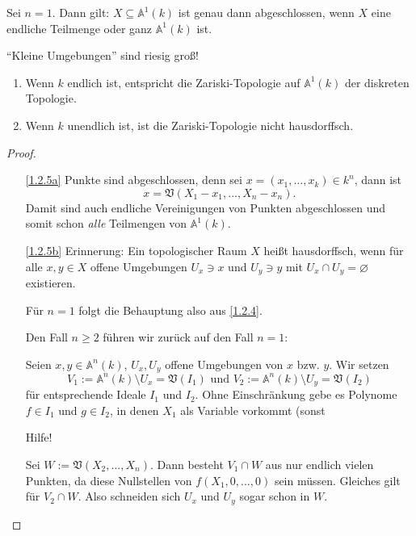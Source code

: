 \documentclass[a4paper,12pt]{scrbook}
\theoremstyle{keinenummern} %
\theoremstyle{mitnummern}
\theoremstyle{unserbeweis}
\newtheorem{proof}{Beweis}
\def\A{\mathbb{A}}
\def\V{\mathfrak{V}}
\newcommand{\leer}{\ensuremath{\varnothing}}
\renewcommand{\dotsc}{\ensuremath{\!...}}
\begin{document}
\begin{bsp}\label{1.2.4}
Sei $n=1$. Dann gilt: $X\subseteq\A^{1}(k)$ ist genau dann abgeschlossen, wenn $X$ eine endliche Teilmenge oder ganz $\A^{1}(k)$ ist.
\end{bsp}

\begin{w}\enquote{Kleine Umgebungen} sind riesig groß!\end{w}

\begin{bem}\label{1.2.5}
\begin{enumerate}
\item{} Wenn $k$ endlich ist, entspricht die Zariski-Topologie auf $\A^{1}(k)$ der diskreten Topologie.
\item{} Wenn $k$ unendlich ist, ist die Zariski-Topologie nicht hausdorffsch.
\end{enumerate}\end{bem}
\begin{proof}\begin{enumerate}
\item[\ref{1.2.5a}] Punkte sind abgeschlossen, denn sei $x=(x_{1},\dotsc,x_{k})\in k^{n}$, dann ist
\[{x}=\V(X_{1}-x_{1},\dotsc,X_{n}-x_{n}).\]
Damit sind auch endliche Vereinigungen von Punkten abgeschlossen und somit schon \emph{alle} Teilmengen von $\A^{1}(k)$.
\item[\ref{1.2.5b}] {\sc Erinnerung:} Ein topologischer Raum $X$ heißt hausdorffsch, wenn für alle $x,y\in X$ offene Umgebungen $U_{x}\ni x$ und $U_{y}\ni y$ mit $U_{x}\cap U_{y}=\leer$ existieren.

Für $n=1$ folgt die Behauptung also aus \cref{1.2.4}.

Den Fall $n\geq 2$ führen wir zurück auf den Fall $n=1$:

Seien $x,y\in\A^{n}(k)$, $U_{x},U_{y}$ offene Umgebungen von $x$ bzw. $y$. Wir setzen
\[V_{1}:=\A^{n}(k)\setminus U_{x} = \V(I_{1})\text{ und }V_{2}:=\A^{n}(k)\setminus U_{y}=\V(I_{2})\]
für entsprechende Ideale $I_{1}$ und $I_{2}$. Ohne Einschränkung gebe es Polynome $f\in I_{1}$ und $g\in I_{2}$, in denen $X_{1}$ als Variable vorkommt (sonst

\begin{w}Hilfe!\end{w}

Sei $W:=\V(X_{2},\dotsc,X_{n})$. Dann besteht $V_{1}\cap W$ aus nur endlich vielen Punkten, da diese Nullstellen von $f(X_{1},0,\dotsc,0)$ sein müssen. Gleiches gilt für $V_{2}\cap W$. Also schneiden sich $U_{x}$ und $U_{y}$ sogar schon in $W$.
\end{enumerate}\end{proof}
\end{document}
